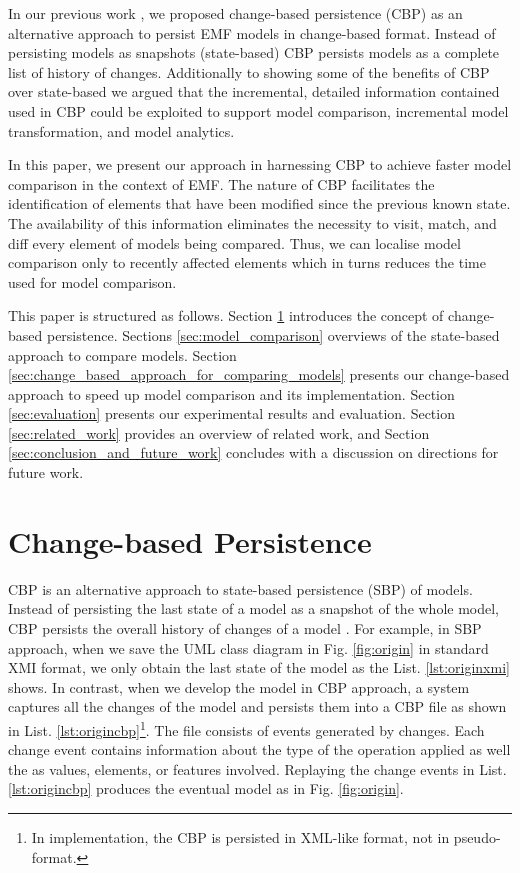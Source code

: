 \documentclass{jot}
\begin{document}
In our previous work \cite{DBLP:conf/models/YohannisKP17,yohannis2018towards,DBLP:conf/models/YohannisRPK18}, we proposed change-based persistence (CBP) as an alternative approach to persist EMF models \cite{steinberg2008emf} in change-based format. Instead of persisting models as snapshots (state-based) CBP persists models as a complete list of history of changes. Additionally to showing some of the benefits of CBP over state-based we argued that the incremental, detailed information contained used in CBP could be exploited to support model comparison, incremental model transformation, and model analytics.

In this paper, we present our approach in harnessing CBP to achieve faster model comparison in the context of EMF. The nature of CBP facilitates the identification of elements that have been modified since the previous known state. The availability of this information eliminates the necessity to visit, match, and diff every element of models being compared. Thus, we can localise model comparison only to recently affected elements which in turns reduces the time used for model comparison.

This paper is structured as follows. Section \ref{sec:change-based_persistence} introduces the concept of change-based persistence. Sections \ref{sec:model_comparison} overviews of the state-based approach to compare models. Section \ref{sec:change_based_approach_for_comparing_models} presents our change-based approach to speed up model comparison and its implementation. Section \ref{sec:evaluation} presents our experimental results and evaluation. Section \ref{sec:related_work} provides an overview of related work, and Section \ref{sec:conclusion_and_future_work} concludes with a discussion on directions for future work.

\vspace{-10pt}
\section{Change-based Persistence}
\label{sec:change-based_persistence}

\vspace{-5pt}
CBP is an alternative approach to state-based persistence (SBP) of models. Instead of persisting the last state of a model as a snapshot of the whole model, CBP persists the overall history of changes of a model \cite{yohannis2018towards}. For example, in SBP approach, when we save the UML class diagram in Fig. \ref{fig:origin} in standard XMI format, we only obtain the last state of the model as the List. \ref{lst:originxmi} shows. In contrast, when we develop the model in CBP approach, a system captures all the changes of the model and persists them into a CBP file as shown in List. \ref{lst:origincbp}\footnote{In implementation, the CBP is persisted in XML-like format, not in pseudo-format.}. The file consists of events generated by changes. Each change event contains information about the type of the operation applied as well the as values, elements, or features involved. Replaying the change events in List. \ref{lst:origincbp} produces the eventual model as in Fig. \ref{fig:origin}.
\end{document}
